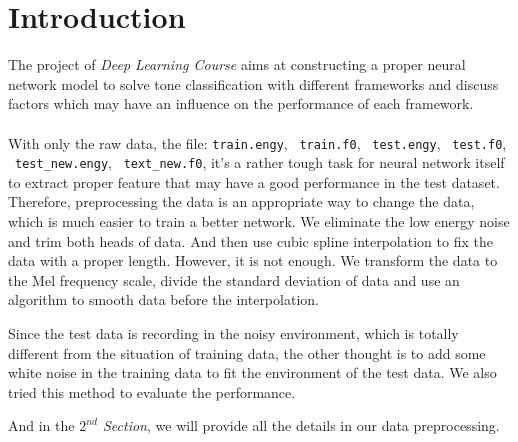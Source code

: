 \documentclass[12pt]{article}
\begin{document}
\section{Introduction}

The project of {\it Deep Learning Course} aims at constructing a proper neural network model to solve tone classification with different frameworks and discuss factors which may have an influence on the performance of each framework.\\
\\
With only the raw data, the file: \texttt{train.engy}, \  \texttt{train.f0}, \ \texttt{test.engy}, \ \texttt{test.f0},  \ \texttt{test\_new.engy}, \ \texttt{text\_new.f0}, it's a rather tough task for neural network itself to extract proper feature that may have a good performance in the test dataset. Therefore, preprocessing the data  is an appropriate way to change the data, which is much easier to train a better network. We eliminate the low energy noise and trim both heads of data. And then use cubic spline interpolation to fix the data with a proper length. However, it is not enough. We transform the data to the Mel frequency scale, divide the standard deviation of data and use an algorithm to smooth data before the interpolation.

Since the test data is recording in the noisy environment, which is totally different from the situation of training data, the other thought is to add some white noise in the training data to fit the environment of the test data. We also tried this method to evaluate the performance.

And in the {\it $2^{nd}$ Section}, we will provide all the details in our data preprocessing.
\vspace{1em}
\end{document}
